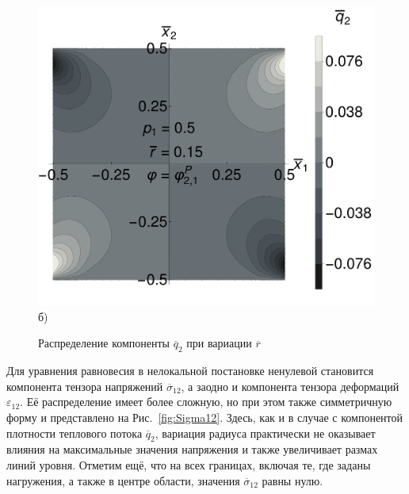 \begin{figure}[ht]
\begin{minipage}[b][][b]{0.49\linewidth}
        \includegraphics[width=\linewidth]{pics/Flux2R015.pdf} \\ б)
    \end{minipage}
    \caption{Распределение компоненты $\overline{q}_2$ при вариации $\overline{r}$}
    \label{fig:Flux2}
\end{figure}

Для уравнения равновесия в нелокальной постановке ненулевой становится компонента тензора напряжений $\overline{\sigma}_{12}$, а заодно и компонента тензора деформаций $\varepsilon_{12}$. Её распределение имеет более сложную, но при этом также симметричную форму и представлено на Рис.~\ref{fig:Sigma12}. Здесь, как и в случае с компонентой плотности теплового потока $\overline{q}_2$, вариация радиуса практически не оказывает влияния на максимальные значения напряжения и также увеличивает размах линий уровня. Отметим ещё, что на всех границах, включая те, где заданы нагружения, а также в центре области, значения $\overline{\sigma}_{12}$ равны нулю.

